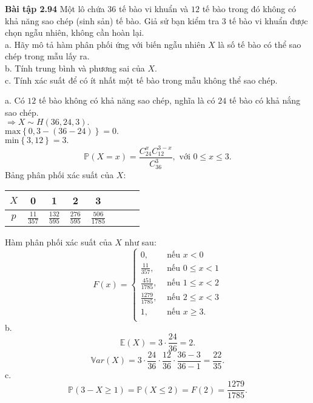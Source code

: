 \documentclass[12pt,a4paper]{article}
\begin{document}
\begin{mybox}
\textbf{Bài tập 2.94} Một lô chứa $36$ tế bào vi khuẩn và $12$ tế bào trong đó không có khả năng sao chép (sinh sản) tế bào. Giả sử bạn kiểm tra 3 tế bào vi khuẩn được chọn ngẫu nhiên, không cần hoàn lại.\\
a. Hãy mô tả hàm phân phối ứng với biến ngẫu nhiên $X$ là số tế bào có thể sao chép trong mẫu lấy ra.\\
b. Tính trung bình và phương sai của $X.$\\
c. Tính xác suất để có ít nhất một tế bào trong mẫu không thể sao chép.
\end{mybox}
a. Có $12$ tế bào không có khả năng sao chép, nghĩa là có $24$ tế bào có khả nắng sao chép.\\
$\Rightarrow X \sim H \left( {36, 24, 3} \right).$\\
$\mathrm{max} \left\{ {0, 3 - \left( {36 - 24} \right)} \right\} = 0.$\\
$\mathrm{min} \left\{ {3, 12} \right\} = 3.$\\
$$\mathbb{P} \left( {X = x} \right) = \frac{C^x_{24}C^{3 - x}_{12}}{C^3_{36}}, \text{ với } 0 \leqslant x \leqslant 3.$$
Bảng phân phối xác suất của $X$:
\begin{table}[H]
                \begin{center}
                    \begin{tabular}{|c|c|c|c|c|c|c|c|}
                        \hline 
                        $X$ & 0 & 1 & 2 & 3  \\ 
                        \hline 
                        $p$ & $\frac{11}{357}$ & $\frac{132}{595}$ & $\frac{276}{595}$ & $\frac{506}{1785}$ \\ 
                        \hline 
                        \end{tabular}
                \end{center}
            \end{table}
Hàm phân phối xác suất của $X$ như sau:
$$ F \left( x \right) = 
	\begin{cases}
	0, &\text{ nếu } x < 0\\
	\frac{11}{357}, &\text{ nếu } 0 \leqslant x < 1\\
	\frac{451}{1785}, &\text{ nếu } 1 \leqslant x < 2\\
	\frac{1279}{1785}, &\text{ nếu } 2 \leqslant x < 3\\
	1, &\text{ nếu } x \geqslant 3.\\
	\end{cases}
$$
b. $$\mathbb{E}\left( X \right) = 3 \cdot \frac{24}{36} = 2.$$
$$\mathbb{V}ar \left( X \right) = 3 \cdot \frac{24}{36} \cdot \frac{12}{36} \cdot \frac{36 - 3}{36 - 1} = \frac{22}{35}.$$
c. $$\mathbb{P} \left( {{3 - X} \geqslant 1} \right) = \mathbb{P} \left( {X \leqslant 2} \right) = F \left( 2 \right) = \frac{1279}{1785}.$$
\end{document}
